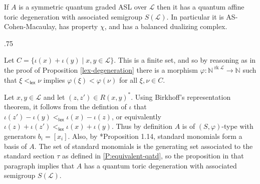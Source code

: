 \documentclass[11pt,fleqn]{article}
\makeatletter
\renewenvironment{proof}[1][\textit{Proof}]{\par
  \pushQED{\qed}%
  \normalfont \topsep.75\paraskip\relax
  \trivlist
  \item[\hskip\labelsep
        \itshape
    #1\@addpunct{.}]\ignorespaces
}{%
  \popQED\endtrivlist\@endpefalse
}
\newcommand\NN{\mathbb N}
\renewcommand\to{\longrightarrow}
\renewcommand\phi{\varphi}
\renewcommand\L{\mathcal L}
\newcommand\lex{\mathsf{lex}}
\DeclareMathOperator\rk{rk}
\makeatother
\begin{document}
\begin{Theorem} 
\label{T:ASL-are-dominated} 
If $A$ is a symmetric quantum graded ASL over $\L$ then it has a quantum 
affine toric degeneration with associated semigroup $S(\L)$. In particular
it is AS-Cohen-Macaulay, has property $\chi$, and has a balanced dualizing 
complex.
\end{Theorem} 
\begin{proof} 
Let $C = \{\iota(x) + \iota(y) \mid x,y \in \L\}$. This is a finite set, and 
so by reasoning as in the proof of Proposition \ref{lex-degeneration} there is 
a morphism $\phi: \NN^{\rk \L} \to \NN$ such that $\xi <_{\lex} \nu$ implies 
$\phi(\xi) < \phi(\nu)$ for all $\xi, \nu \in C$. 

Let $x,y \in \L$ and let $(z,z') \in R(x,y)^*$. Using Birkhoff's 
representation theorem, it follows from the defintion of $\iota$ that 
$\iota(z') - \iota(y) <_{\lex} \iota(x) - \iota(z)$, or equivalently $\iota(z) 
+ \iota(z') <_{\lex} \iota(x) + \iota(y)$. Thus by definition $A$ is of 
$(S,\phi)$-type with generators $b_i = [x_i]$. Also, by 
\cite{LR1}*{Proposition 1.14}, standard monomials form a basis of $A$. The set 
of standard monomials is the generating set associated to the standard section 
$\tau$ as defined in \ref{P:equivalent-qatd}, so the proposition in that 
paragraph implies that $A$ has a quantum toric degeneration with associated 
semigroup $S(\L)$.
\end{proof}
\end{document}
